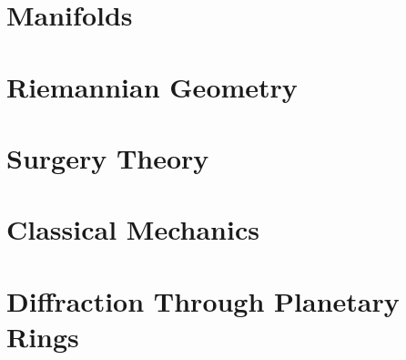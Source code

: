 \documentclass[oneside]{book}                                                  %
\newcommand*{\TOPPATH}{books}
\newcommand*{\PATH}{\TOPPATH/}
\newcounter{endpage}
\begin{document}
        \part{Manifolds}
            
        \part{Riemannian Geometry}
            
    \clearpage

    \setcounter{endpage}{\thepage}
        \label{book:Geometric_Topology}
        \renewcommand{\PATH}{\TOPPATH/Geometric_Topology}
        \setcounter{page}{\value{endpage}}
        \part{Surgery Theory}
    \clearpage

    \setcounter{endpage}{\thepage}
        \label{book:Physics}
        \renewcommand{\PATH}{\TOPPATH/Physics}
        \setcounter{page}{\value{endpage}}
        \part{Classical Mechanics}
            
        \part{Diffraction Through Planetary Rings}
            
            
            
    \clearpage

    \printnoidxglossary[type=\acronymtype]
    \clearpage
    \printnoidxglossary[type=notation, style=mcolindex, sort=def]
    \clearpage
    \printnoidxglossary[style=longpara]

    \clearpage
    \nocite{*}
    
    

    \clearpage
    \printindex
\end{document}

